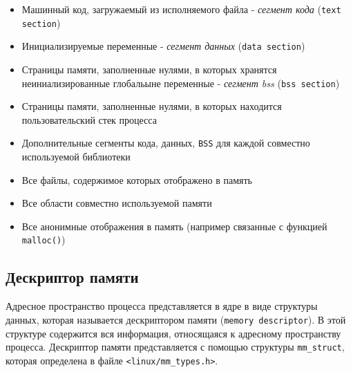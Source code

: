 \documentclass[12pt]{article}
\begin{document}
\begin{itemize}
    \item Машинный код, загружаемый из исполняемого файла - \emph{сегмент кода} (\verb!text section!)
    \item Инициализируемые переменные - \emph{сегмент данных} (\verb!data section!)
    \item Страницы памяти, заполненные нулями, в которых хранятся неиниализированные глобальыне переменные - \emph{сегмент bss} (\verb!bss section!)
    \item Страницы памяти, заполненные нулями, в которых находится пользовательский стек процесса
    \item Дополнительные сегменты кода, данных, \verb!BSS! для каждой совместно используемой библиотеки
    \item Все файлы, содержимое которых отображено в память
    \item Все области совместно используемой памяти
    \item Все анонимные отображения в память (например связанные с функцией \verb!malloc()!)
\end{itemize}

\pagebreak
\subsection*{Дескриптор памяти}

Адресное пространство процесса представляется в ядре в виде структуры данных, 
которая называется дескриптором памяти (\verb!memory descriptor!).
В этой структуре содержится вся информация, относящаяся к адресному пространству процесса. 
Дескриптор памяти представляется с помощью структуры \verb!mm_struct!, которая определена в файле \verb!<linux/mm_types.h>!.
\end{document}
